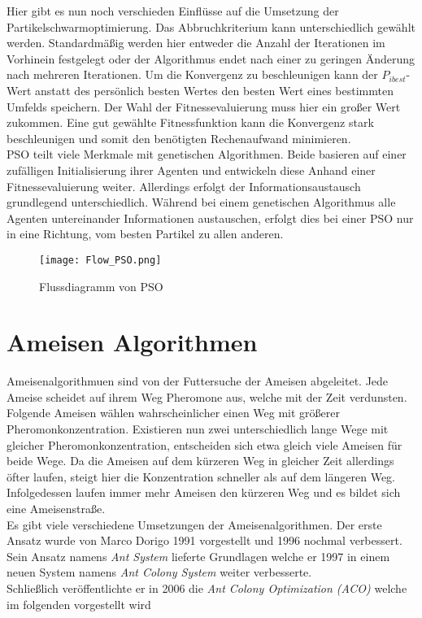 Hier gibt es nun noch verschieden Einflüsse auf die Umsetzung der Partikelschwarmoptimierung.
Das Abbruchkriterium kann unterschiedlich gewählt werden. Standardmäßig werden hier entweder die Anzahl der Iterationen im Vorhinein festgelegt oder der Algorithmus endet nach einer zu geringen Änderung nach mehreren Iterationen. 
Um die Konvergenz zu beschleunigen kann der $P_{ibest}$-Wert anstatt des persönlich besten Wertes den besten Wert eines bestimmten Umfelds speichern.
Der Wahl der Fitnessevaluierung muss hier ein großer Wert zukommen. Eine gut gewählte Fitnessfunktion kann die Konvergenz stark beschleunigen und somit den benötigten Rechenaufwand minimieren.\\
PSO teilt viele Merkmale mit genetischen Algorithmen. Beide basieren auf einer zufälligen Initialisierung ihrer Agenten und entwickeln diese Anhand einer Fitnessevaluierung weiter. Allerdings erfolgt der Informationsaustausch grundlegend unterschiedlich. Während bei einem genetischen Algorithmus alle Agenten untereinander Informationen austauschen, erfolgt dies bei einer PSO nur in eine Richtung, vom besten Partikel zu allen anderen.\\


\begin{figure}
  \centering
  \texttt{[image: Flow\_PSO.png]}
  \caption{Flussdiagramm von PSO}
  \label{fig:Figure_PSO}
\end{figure}


\section{Ameisen Algorithmen}
Ameisenalgorithmuen sind von der Futtersuche der Ameisen abgeleitet. Jede Ameise scheidet auf ihrem Weg Pheromone aus, welche mit der Zeit verdunsten. 
Folgende Ameisen wählen wahrscheinlicher einen Weg mit größerer Pheromonkonzentration. 
Existieren nun zwei unterschiedlich lange Wege mit gleicher Pheromonkonzentration, entscheiden sich etwa gleich viele Ameisen für beide Wege. 
Da die Ameisen auf dem kürzeren Weg in gleicher Zeit allerdings öfter laufen, steigt hier die Konzentration schneller als auf dem längeren Weg. 
Infolgedessen laufen immer mehr Ameisen den kürzeren Weg und es bildet sich eine Ameisenstraße.\\

Es gibt viele verschiedene Umsetzungen der Ameisenalgorithmen. Der erste Ansatz wurde von Marco Dorigo 1991 vorgestellt\cite{Dorigo1991AntSA} und 1996 nochmal verbessert\cite{484436}.
Sein Ansatz namens \emph{Ant System} lieferte Grundlagen welche er 1997 in einem neuen System namens \emph{Ant Colony System} weiter verbesserte\cite{585892}.\\
Schließlich veröffentlichte er in 2006 die \emph{Ant Colony Optimization (ACO)} welche im folgenden vorgestellt wird\cite{4129846} \\


